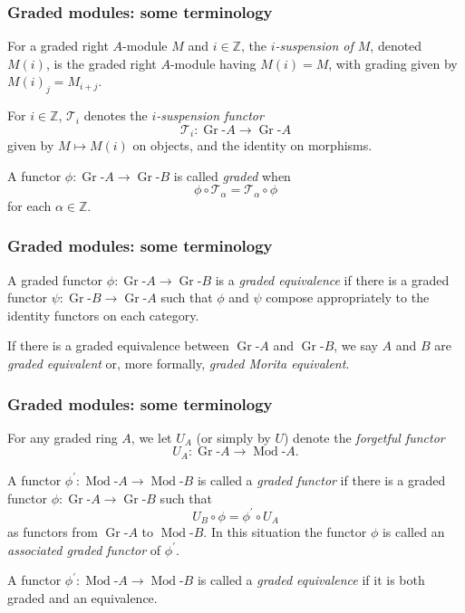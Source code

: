 \documentclass{beamer}
\newcommand{\rmod}[1]{\operatorname{Mod}\text{-}#1}
\newcommand{\grmod}[1]{\operatorname{Gr}\text{-}#1}
\begin{document}
\begin{frame}
\frametitle{Graded modules:  some terminology}
 

    For a graded right $A$-module $M$ and $i \in \mathbb{Z}$, the \emph{$i$-suspension of $M$}, denoted $M(i)$, is the graded right $A$-module having $M(i) = M$, with grading given by $M(i)_j = M_{i+j}$.  
    
    \bigskip
    
      For $i \in \mathbb{Z}$,   $\mathcal{T}_i$ denotes the \emph{$i$-suspension functor}  $$\mathcal{T}_i:  \grmod{A} \to \grmod{A}$$  
      given by $M \mapsto M(i)$ on objects, and the identity on morphisms.
      
      \bigskip
      

A functor $\phi: \grmod{A} \to \grmod{B}$ is called {\it graded} when $$\phi \circ \mathcal{T}_\alpha = \mathcal{T}_\alpha \circ \phi $$ for each $\alpha \in \mathbb{Z}$.   


\end{frame}




\begin{frame}
\frametitle{Graded modules:  some terminology}


  A graded functor $\phi : \grmod{A} \to \grmod{B}$ is a {\it graded equivalence} if there is a graded functor $\psi : \grmod{B} \to \grmod{A}$ such that $\phi$ and $\psi$ compose appropriately to the identity functors on each category.   


\bigskip
\bigskip


  If there is a graded equivalence between $\grmod{A}$ and $\grmod{B}$, we say $A$ and $B$ are {\it graded equivalent} or, more formally,  {\it graded Morita equivalent}.  
  
  

\end{frame}




\begin{frame}
\frametitle{Graded modules:  some terminology}
 

  

For any graded ring $A$, we let $U_A$ (or simply by $U$) denote the {\it forgetful functor} 
$$U_A: \grmod{A} \to \rmod{A}.$$

  A functor $\phi^{\prime} : \rmod{A} \to \rmod{B}$ is called a {\it graded functor} if there is a graded functor $\phi: \grmod{A} \to \grmod{B}$ such that  
  $$ U_B \circ \phi   =   \phi^{\prime} \circ U_A$$ as functors from $\grmod{A}$ to $\rmod{B}$.    
 In this situation the functor $\phi$ is called an {\it associated graded functor} of $\phi^{\prime}$.    


\bigskip

A functor $\phi^\prime : \rmod{A} \to \rmod{B}$ is called a {\it graded equivalence} if it is both graded and an equivalence.  




\end{frame}
\end{document}
